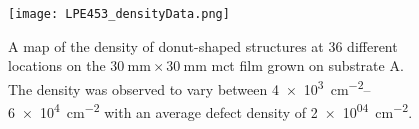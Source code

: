 \begin{figure}[htbp]
    \centering
    \texttt{[image: LPE453\_densityData.png]}
    \caption[Map of the density of donut-shaped structures on the \ac{mct} film grown on substrate A.]{A map of the density of donut-shaped structures at 36 different locations on the $\SI{30}{\milli\metre}\times\SI{30}{\milli\metre}$ \ac{mct} film grown on substrate A. The density was observed to vary between \SIrange{4e+3}{6e+4}{\centi\metre^{-2}} with an average defect density of \SI{2e+04}{\centi\metre^{-2}}.}
    \label{fig:LPE453_densityData}
\end{figure}




